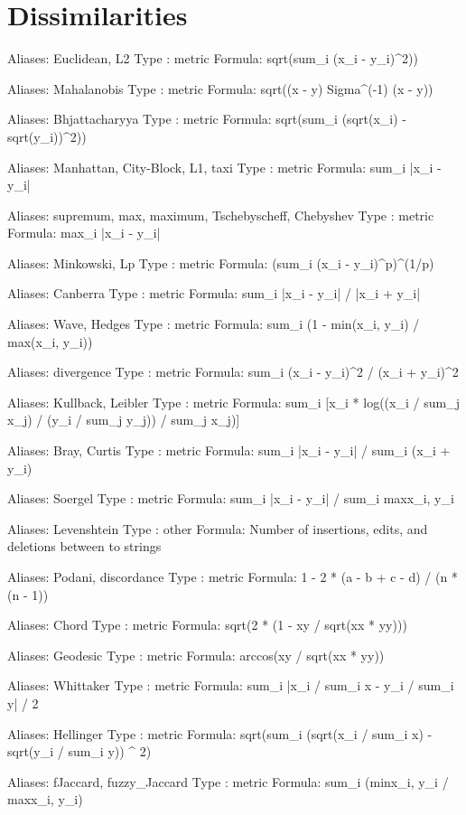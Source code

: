 \documentclass{article}
\begin{document}
\section{Dissimilarities}
\begin{Schunk}
\begin{Soutput}
Aliases: Euclidean, L2
Type   : metric
Formula: sqrt(sum_i (x_i - y_i)^2))

Aliases: Mahalanobis
Type   : metric
Formula: sqrt((x - y) Sigma^(-1) (x - y))

Aliases: Bhjattacharyya
Type   : metric
Formula: sqrt(sum_i (sqrt(x_i) - sqrt(y_i))^2))

Aliases: Manhattan, City-Block, L1, taxi
Type   : metric
Formula: sum_i |x_i - y_i|

Aliases: supremum, max, maximum, Tschebyscheff, Chebyshev
Type   : metric
Formula: max_i |x_i - y_i|

Aliases: Minkowski, Lp
Type   : metric
Formula: (sum_i (x_i - y_i)^p)^(1/p)

Aliases: Canberra
Type   : metric
Formula: sum_i |x_i - y_i| / |x_i + y_i|

Aliases: Wave, Hedges
Type   : metric
Formula: sum_i (1 - min(x_i, y_i) / max(x_i, y_i))

Aliases: divergence
Type   : metric
Formula: sum_i (x_i - y_i)^2 / (x_i + y_i)^2

Aliases: Kullback, Leibler
Type   : metric
Formula: sum_i [x_i * log((x_i / sum_j x_j) / (y_i / sum_j y_j)) / sum_j x_j)]

Aliases: Bray, Curtis
Type   : metric
Formula: sum_i |x_i - y_i| / sum_i (x_i + y_i)

Aliases: Soergel
Type   : metric
Formula: sum_i |x_i - y_i| / sum_i max{x_i, y_i}

Aliases: Levenshtein
Type   : other
Formula: Number of insertions, edits, and deletions between to strings

Aliases: Podani, discordance
Type   : metric
Formula: 1 - 2 * (a - b + c - d) / (n * (n - 1))

Aliases: Chord
Type   : metric
Formula: sqrt(2 * (1 - xy / sqrt(xx * yy)))

Aliases: Geodesic
Type   : metric
Formula: arccos(xy / sqrt(xx * yy))

Aliases: Whittaker
Type   : metric
Formula: sum_i |x_i / sum_i x - y_i / sum_i y| / 2

Aliases: Hellinger
Type   : metric
Formula: sqrt(sum_i (sqrt(x_i / sum_i x) - sqrt(y_i / sum_i y)) ^ 2)

Aliases: fJaccard, fuzzy_Jaccard
Type   : metric
Formula: sum_i (min{x_i, y_i} / max{x_i, y_i})
\end{Soutput}
\end{Schunk}
\end{document}
